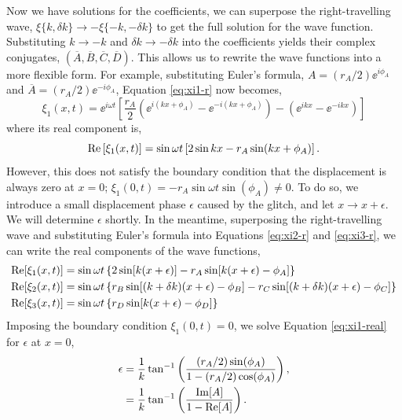 Now we have solutions for the coefficients, we can superpose the right-travelling wave, \(\xi\{k, \delta k\} \rightarrow - \xi\{-k, -\delta k\}\) to get the full solution for the wave function. Substituting \(k \rightarrow -k\) and \(\delta k \rightarrow -\delta k\) into the coefficients yields their complex conjugates, \((\overline{A},\overline{B},\overline{C},\overline{D})\). This allows us to rewrite the wave functions into a more flexible form. For example, substituting Euler's formula, \(A = (r_A/2) \ee^{i\phi_A}\) and \(\overline{A} = (r_A/2) \ee^{-i\phi_A}\), Equation \ref{eq:xi1-r} now becomes,
%
\begin{equation}
    \xi_1(x, t) = \ee^{i \omega t} \left[ \frac{r_A}{2} \left( \ee^{i(kx + \phi_A)} - \ee^{-i(kx + \phi_A)} \right) - \left( \ee^{ikx} - \ee^{-ikx} \right) \right] \label{eq:xi1}
\end{equation}
%
where its real component is,
\begin{equation}
    {\mathrm{Re}}\left[\xi_1(x, t)\right] = \sin \omega t \left[2 \sin kx - r_A \sin(kx + \phi_A)\right].
\end{equation}
%
However, this does not satisfy the boundary condition that the displacement is always zero at \(x=0\); \(\xi_1(0, t) = - r_A \sin \omega t \sin(\phi_A) \neq 0\). To do so, we introduce a small displacement phase \(\epsilon\) caused by the glitch, and let \(x \rightarrow x + \epsilon\). We will determine \(\epsilon\) shortly. In the meantime, superposing the right-travelling wave and substituting Euler's formula into Equations \ref{eq:xi2-r} and \ref{eq:xi3-r}, we can write the real components of the wave functions,
%
%
%
\begin{align}
    {\mathrm{Re}}[\xi_1(x, t)] &= \sin \omega t \left\{2 \sin[k (x + \epsilon)] - r_A \sin[k(x + \epsilon) - \phi_A]\right\} \label{eq:xi1-real} \\
    {\mathrm{Re}}[\xi_2(x, t)] &= \sin \omega t \left\{ r_B \sin[(k + \delta k)(x + \epsilon) - \phi_B] - r_C \sin[(k + \delta k)(x + \epsilon) - \phi_C]\right\} \\
    {\mathrm{Re}}[\xi_3(x, t)] &= \sin \omega t \left\{r_D \sin[k(x + \epsilon) - \phi_D]\right\} \label{eq:xi3-real}
\end{align}
%
Imposing the boundary condition \(\xi_1(0, t) = 0\), we solve Equation \ref{eq:xi1-real} for \(\epsilon\) at \(x=0\),
%
\begin{align}
    \epsilon &= \frac{1}{k} \tan^{-1}\left( \frac{(r_A / 2) \sin(\phi_A)}{1 - (r_A/2) \cos(\phi_A)} \right), \notag\\
    &= \frac{1}{k} \tan^{-1}\left( \frac{{\mathrm{Im}}[A]}{1 - {\mathrm{Re}}[A]} \right). \label{eq:1d-phase}
\end{align}
%

